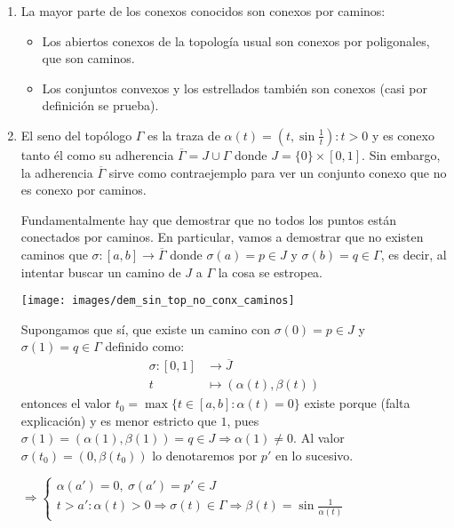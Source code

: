 \begin{ej}
\begin{enumerate}
    \item La mayor parte de los conexos conocidos son conexos por caminos:
    \begin{itemize}
        \item Los abiertos conexos de la topología usual son conexos por poligonales, que son caminos.
        \item Los conjuntos convexos y los estrellados también son conexos (casi por definición se prueba).
    \end{itemize}
    \item El seno del topólogo $\Gamma$ es la traza de $\alpha\left( t \right) = \left( t, \sin\frac{1}{t} \right) : t > 0$ y es conexo tanto él como su adherencia $\overline{\Gamma} = J \cup \Gamma$ donde $J = \{0\} \times \left[ 0, 1 \right]$. Sin embargo, la adherencia $\overline{\Gamma}$ sirve como contraejemplo para ver un conjunto conexo que no es conexo por caminos.
    \begin{demo}
    Fundamentalmente hay que demostrar que no todos los puntos están conectados por caminos. En particular, vamos a demostrar que no existen caminos que $\sigma: \left[ a, b \right] \rightarrow \overline{\Gamma}$ donde $\sigma\left( a \right) = p \in J$ y $\sigma\left( b \right) = q \in \Gamma$, es decir, al intentar buscar un camino de $J$ a $\Gamma$ la cosa se estropea.
    	\begin{center}
            \texttt{[image: images/dem\_sin\_top\_no\_conx\_caminos]} 
        \end{center}
	Supongamos que sí, que existe un camino con $\sigma(0) = p \in J$ y $\sigma(1) = q \in \Gamma$ definido como:
	\begin{align*}
		\sigma : [0, 1] &\longrightarrow \overline{J} \\
					t &\longmapsto (\alpha(t), \beta(t))
	\end{align*}
	entonces el valor $t_0 = \max \{t \in \left[ a, b \right] : \alpha\left( t \right) = 0\}$ existe porque (falta explicación) y es menor estricto que $1$, pues $\sigma(1) = (\alpha(1), \beta(1)) = q \in J \Rightarrow \alpha(1) \neq 0$. Al valor $\sigma(t_0) = (0, \beta(t_0))$ lo denotaremos por $p'$ en lo sucesivo.
	
	   $\Rightarrow \begin{cases}
                \alpha\left( a' \right) = 0,\ \sigma\left( a' \right) = p' \in J\\
                t > a': \alpha\left( t \right) > 0 \Rightarrow \sigma\left( t \right) \in \Gamma \Rightarrow \beta\left( t \right) = \sin \frac{1}{\alpha\left( t \right)} 
            \end{cases} $


\end{demo}
\end{enumerate}
\end{ej}
